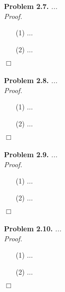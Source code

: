 \documentclass{article}
\begin{document}
\textbf{Problem 2.7.}
\emph{...} \\



\emph{Proof.}
\begin{enumerate}
\item[(1)]
  ...

\item[(2)]
  ...
\end{enumerate}
$\Box$ \\\\






\textbf{Problem 2.8.}
\emph{...} \\



\emph{Proof.}
\begin{enumerate}
\item[(1)]
  ...

\item[(2)]
  ...
\end{enumerate}
$\Box$ \\\\






\textbf{Problem 2.9.}
\emph{...} \\



\emph{Proof.}
\begin{enumerate}
\item[(1)]
  ...

\item[(2)]
  ...
\end{enumerate}
$\Box$ \\\\






\textbf{Problem 2.10.}
\emph{...} \\



\emph{Proof.}
\begin{enumerate}
\item[(1)]
  ...

\item[(2)]
  ...
\end{enumerate}
$\Box$ \\\\
\end{document}
